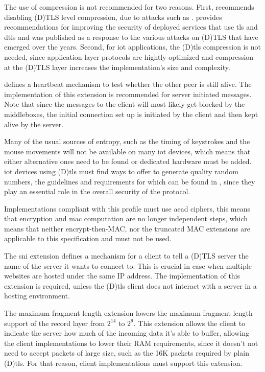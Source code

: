 \documentclass{llncs}
\begin{document}
The use of compression is not recommended for two reasons. First, \cite{RFC7525}
recommends disabling (D)TLS level compression, due to attacks such as \cite{TODO}.
 provides recommendations for improving the security of deployed services
that use \gls{tls} and \gls{dtls} and was published as a response to the various
attacks on (D)TLS that have emerged over the years. Second, for \gls{iot} applications,
the (D)\gls{tls} compression is not needed, since application-layer protocols are hightly
optimized and compression at the (D)TLS layer increases the implementation's size and complexity.

 defines a heartbeat mechanism to test whether the other peer
is still alive. The implementation of this extension is recommended for server
initiated messages. Note that since the messages to the client will most likely
get blocked by the middleboxes, the initial connection set up is initiated by the
client and then kept alive by the server.

Many of the usual sources of entropy, such as the timing of keystrokes and the
mouse movements will not be available on many \gls{iot} devices, which means that
either alternative ones need to be found or dedicated hardware must be added.
\gls{iot} devices using (D)\gls{tls} must find ways to offer to generate quality
random numbers, the guidelines and requirements for which can be found in \cite{rfc4086},
since they play an essential role in the overall security of the protocol.

Implementations compliant with this profile must use \gls{aead} ciphers, this means
that encryption and \gls{mac} computation are no longer independent steps, which means
that neither encrypt-then-MAC\cite{RFC7366}, nor the truncated MAC\cite{RFC6066} extensions are applicable
to this specification and must not be used.

The \gls{sni} extension\cite{RFC6066} defines a mechanism for a client to
tell a (D)TLS server the name of the server it wants to connect to. This is
crucial in case when multiple websites are hosted under the same IP address.
The implementation of this extension is required, unless the (D)\gls{tls}
client does not interact with a server in a hosting environment.

The maximum fragment length extension\cite{RFC6066} lowers the maximum fragment
length support of the record layer from $2^14$ to $2^9$. This extension allows
the client to indicate the server how much of the incoming data it's able to buffer,
allowing the client implementations to lower their RAM requirements, since it doesn't
not need to accept packets of large size, such as the 16K packets required by
plain (D)\gls{tls}. For that reason, client implementations must support this
extension.
\end{document}
